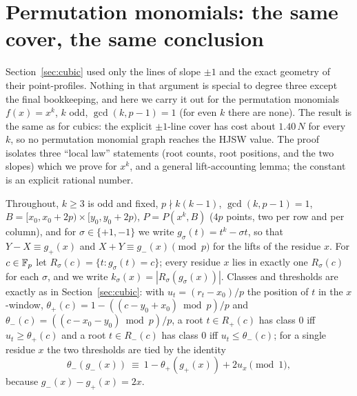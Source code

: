 
\section{Permutation monomials: the same cover, the same conclusion}\label{sec:perm}

Section~\ref{sec:cubic} used only the lines of slope $\pm1$ and the exact geometry of their point-profiles.  Nothing in that argument is
special to degree three except the final bookkeeping, and here we carry it out for the permutation monomials $f(x)=x^k$, $k$ odd, $\gcd(k,p-1)=1$
(for even $k$ there are none).  The result is the same as for cubics: the explicit $\pm1$-line cover has cost about $1.40\,N$ for every $k$, so no
permutation monomial graph reaches the HJSW value.  The proof isolates three ``local law'' statements (root counts, root positions, and the two
slopes) which we prove for $x^k$, and a general lift-accounting lemma; the constant is an explicit rational number.

Throughout, $k\ge3$ is odd and fixed, $p\nmid k(k-1)$, $\gcd(k,p-1)=1$, $B=[x_0,x_0+2p)\times[y_0,y_0+2p)$, $P=P(x^k,B)$ ($4p$ points, two per row and
per column), and for $\sigma\in\{+1,-1\}$ we write $g_\sigma(t)=t^k-\sigma t$, so that $Y-X\equiv g_+(x)$ and $X+Y\equiv g_-(x)\pmod p$ for the lifts of the
residue $x$.  For $c\in\mathbb{F}_p$ let $R_\sigma(c)=\{t: g_\sigma(t)=c\}$; every residue $x$ lies in exactly one $R_\sigma(c)$ for each $\sigma$, and we write
$k_\sigma(x)=|R_\sigma(g_\sigma(x))|$.  Classes and thresholds are exactly as in Section~\ref{sec:cubic}: with $u_t=(r_t-x_0)/p$ the position of $t$ in the
$x$-window, $\theta_+(c)=1-((c-y_0+x_0)\bmod p)/p$ and $\theta_-(c)=((c-x_0-y_0)\bmod p)/p$, a root $t\in R_+(c)$ has class $0$ iff $u_t\ge\theta_+(c)$ and a root
$t\in R_-(c)$ has class $0$ iff $u_t\le\theta_-(c)$; for a single residue $x$ the two thresholds are tied by the identity
\begin{equation}\label{eq:tie}
 \theta_-(g_-(x))\ \equiv\ 1-\theta_+(g_+(x))+2u_x\pmod 1 ,
\end{equation}
because $g_-(x)-g_+(x)=2x$.

